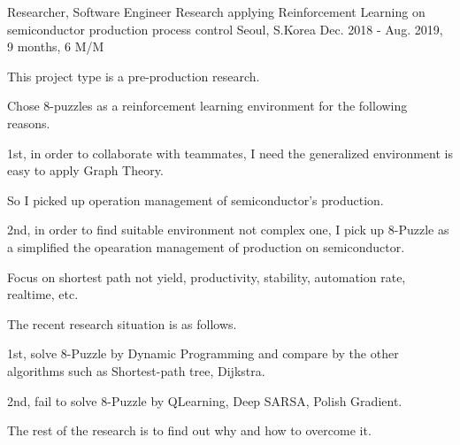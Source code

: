 \begin{cventries}
  \cventry
    {Researcher, Software Engineer} %
    {Research applying Reinforcement Learning on semiconductor production process control} %
    {Seoul, S.Korea} %
    {Dec. 2018 - Aug. 2019, 9 months, 6 M/M} %
    {
      \begin{cvitems} %
        \item {This project type is a pre-production research.}
        \item {Chose 8-puzzles as a reinforcement learning environment for the following reasons.}
        \item {1st, in order to collaborate with teammates, I need the generalized environment is easy to apply Graph Theory.}
        \item {So I picked up operation management of semiconductor's production.}
        \item {2nd, in order to find suitable environment not complex one, I pick up 8-Puzzle as a simplified the opearation management of production on semiconductor.}
        \item {Focus on shortest path not yield, productivity, stability, automation rate, realtime, etc.}
        \item {The recent research situation is as follows.}
        \item {1st, solve 8-Puzzle by Dynamic Programming and compare by the other algorithms such as Shortest-path tree, Dijkstra.}
        \item {2nd, fail to solve 8-Puzzle by QLearning, Deep SARSA, Polish Gradient.}
        \item {The rest of the research is to find out why and how to overcome it.}
      \end{cvitems}
    }


\end{cventries}
